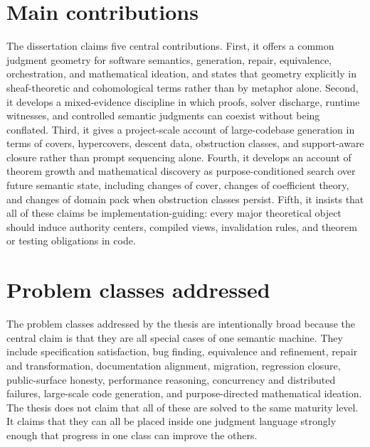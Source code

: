 \documentclass[11pt]{report}
\begin{document}
\section{Main contributions}
The dissertation claims five central contributions. First, it offers a common judgment geometry for software semantics, generation, repair, equivalence, orchestration, and mathematical ideation, and states that geometry explicitly in sheaf-theoretic and cohomological terms rather than by metaphor alone. Second, it develops a mixed-evidence discipline in which proofs, solver discharge, runtime witnesses, and controlled semantic judgments can coexist without being conflated. Third, it gives a project-scale account of large-codebase generation in terms of covers, hypercovers, descent data, obstruction classes, and support-aware closure rather than prompt sequencing alone. Fourth, it develops an account of theorem growth and mathematical discovery as purpose-conditioned search over future semantic state, including changes of cover, changes of coefficient theory, and changes of domain pack when obstruction classes persist. Fifth, it insists that all of these claims be implementation-guiding: every major theoretical object should induce authority centers, compiled views, invalidation rules, and theorem or testing obligations in code.

\section{Problem classes addressed}
The problem classes addressed by the thesis are intentionally broad because the central claim is that they are all special cases of one semantic machine. They include specification satisfaction, bug finding, equivalence and refinement, repair and transformation, documentation alignment, migration, regression closure, public-surface honesty, performance reasoning, concurrency and distributed failures, large-scale code generation, and purpose-directed mathematical ideation. The thesis does not claim that all of these are solved to the same maturity level. It claims that they can all be placed inside one judgment language strongly enough that progress in one class can improve the others.
\end{document}
